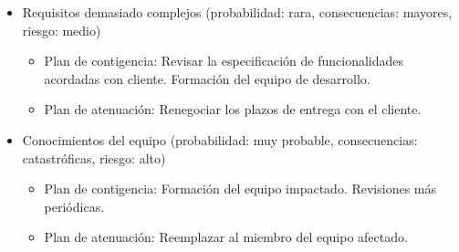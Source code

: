 \documentclass[a4paper,11pt]{report}
\begin{document}
\begin{itemize}
    \item Requisitos demasiado complejos (probabilidad: rara, consecuencias: mayores, riesgo: medio)
    \begin{itemize}
        \item Plan de contigencia: Revisar la especificación de funcionalidades acordadas con cliente. Formación del equipo de desarrollo.
        \item Plan de atenuación: Renegociar los plazos de entrega con el cliente.
    \end{itemize}

    \item Conocimientos del equipo (probabilidad: muy probable, consecuencias: catastróficas, riesgo: alto)
    \begin{itemize}
        \item Plan de contigencia: Formación del equipo impactado. Revisiones más periódicas.
        \item Plan de atenuación: Reemplazar al miembro del equipo afectado.
    \end{itemize}

\end{itemize}
\end{document}
